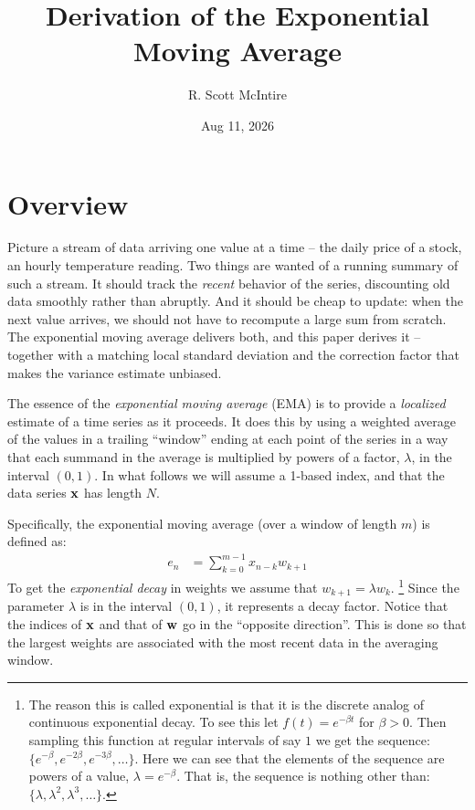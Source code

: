\documentclass{article}
\title{Derivation of the Exponential Moving Average}
\author{R. Scott McIntire}
\date{Aug 11, 2026}
\begin{document}
\maketitle

\section{Overview}

Picture a stream of data arriving one value at a time -- the daily price
of a stock, an hourly temperature reading. Two things are wanted of a
running summary of such a stream. It should track the {\em recent\/}
behavior of the series, discounting old data smoothly rather than
abruptly. And it should be cheap to update: when the next value arrives,
we should not have to recompute a large sum from scratch. The exponential
moving average delivers both, and this paper derives it -- together with a
matching local standard deviation and the correction factor that makes
the variance estimate unbiased.

The essence of the {\em exponential moving average\/} (EMA) is to provide
a {\em localized\/} estimate of a time series as it proceeds. It does 
this by using a weighted average of the values in a trailing ``window'' ending at each point 
of the series in a way that each summand in
the average is multiplied by powers of a factor, $\lambda$,
in the interval $(0,1)$.
In what follows we will assume a 1-based index, and that
the data series ${\bf x}$ has length $N$.

Specifically, the exponential moving average (over a window of length $m$) 
is defined as:
\begin{align}
    e_n &= \sum_{k=0}^{m-1} x_{n-k} w_{k+1}  \label{ema_def}
\end{align}
To get the {\em exponential decay\/} in weights we assume that $w_{k+1} = \lambda w_k$.%
\footnote{The reason this is called exponential is that it is the discrete
analog of continuous exponential decay. To see this let $f(t) = e^{-\beta t}$
for $\beta > 0$. Then sampling this function at regular intervals of say $1$
we get the sequence: $\{ e^{-\beta}, e^{-2\beta}, e^{-3\beta}, \ldots \}$.
Here we can see that the elements of the sequence are powers of a value, $\lambda = e^{-\beta}$.
That is, the sequence is nothing other than: $\{\lambda, \lambda^2, \lambda^3, \ldots \}$.}
Since the parameter $\lambda$ is in the interval $(0,1)$, it represents a decay factor. 
Notice that the indices of ${\bf x}$ and that of ${\bf w}$ go in the ``opposite direction''.
This is done so that the largest weights are associated with the most recent data
in the averaging window.
\end{document}
